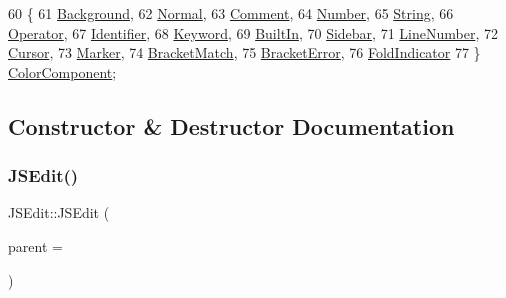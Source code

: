 \begin{DoxyCode}
60                  \{
61         \hyperlink{class_j_s_edit_a5a465193a1344e5be9b04f5ff7883213a79b93a41435ddfd6b670821e7be31306}{Background},
62         \hyperlink{class_j_s_edit_a5a465193a1344e5be9b04f5ff7883213a51b1886888e6bf8841064a795bd6ab8d}{Normal},
63         \hyperlink{class_j_s_edit_a5a465193a1344e5be9b04f5ff7883213a430947e4b883553d04f618a799095f4d}{Comment},
64         \hyperlink{class_j_s_edit_a5a465193a1344e5be9b04f5ff7883213aeebc6c595d9a8bc74d3b03bd4c8f2d1f}{Number},
65         \hyperlink{class_j_s_edit_a5a465193a1344e5be9b04f5ff7883213a60b69a2cc0268b2048fceadf7067e231}{String},
66         \hyperlink{class_j_s_edit_a5a465193a1344e5be9b04f5ff7883213a7cf7fcdce0c49ff9995b8d8a02a3b127}{Operator},
67         \hyperlink{class_j_s_edit_a5a465193a1344e5be9b04f5ff7883213a06246136a94298b2d147a9d3dea7fd89}{Identifier},
68         \hyperlink{class_j_s_edit_a5a465193a1344e5be9b04f5ff7883213ad70548abdd876f2648764b7924b90251}{Keyword},
69         \hyperlink{class_j_s_edit_a5a465193a1344e5be9b04f5ff7883213a8b227288b9e8c72ccb15968f3127f6c2}{BuiltIn},
70         \hyperlink{class_j_s_edit_a5a465193a1344e5be9b04f5ff7883213acda2a01a6da3090252b320a2c4b99133}{Sidebar},
71         \hyperlink{class_j_s_edit_a5a465193a1344e5be9b04f5ff7883213a43eb7503aa3a0f0520a2ad5c71b4d419}{LineNumber},
72         \hyperlink{class_j_s_edit_a5a465193a1344e5be9b04f5ff7883213a5438637d9a462daaa47e0fdea5f342cc}{Cursor},
73         \hyperlink{class_j_s_edit_a5a465193a1344e5be9b04f5ff7883213a098e62a1854a46cb2b58c49ee5d78208}{Marker},
74         \hyperlink{class_j_s_edit_a5a465193a1344e5be9b04f5ff7883213a0c0c2038c38e75704e991bcf7c63dc7f}{BracketMatch},
75         \hyperlink{class_j_s_edit_a5a465193a1344e5be9b04f5ff7883213af2e19200abafb0bf0534dd89fd73c63b}{BracketError},
76         \hyperlink{class_j_s_edit_a5a465193a1344e5be9b04f5ff7883213a364777f3c240e11db6d1d2a8c7b9962d}{FoldIndicator}
77     \} \hyperlink{class_j_s_edit_a5a465193a1344e5be9b04f5ff7883213}{ColorComponent};
\end{DoxyCode}


\subsection{Constructor \& Destructor Documentation}
\mbox{\label{class_j_s_edit_a8f9e2f3aa005871d8eb1a541b8e872cf}} 
\subsubsection{\texorpdfstring{J\+S\+Edit()}{JSEdit()}}
{\footnotesize\ttfamily J\+S\+Edit\+::\+J\+S\+Edit (\begin{DoxyParamCaption}\item[{Q\+Widget $\ast$}]{parent = {} }\end{DoxyParamCaption})}



